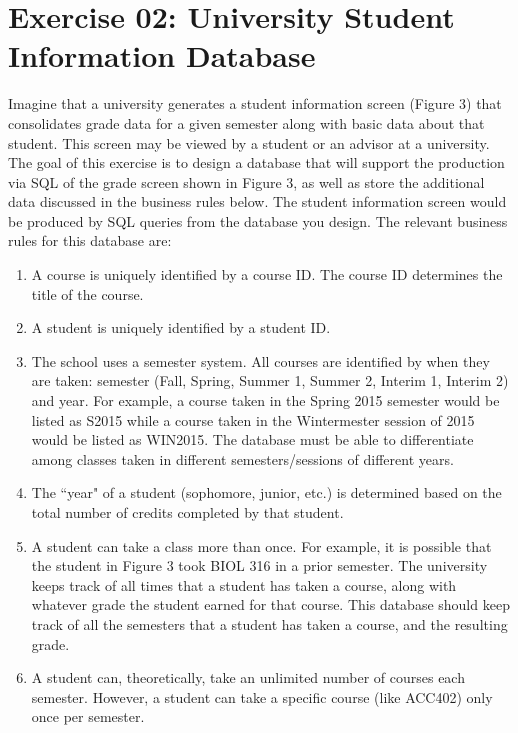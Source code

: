 \documentclass{article}
\begin{document}
\section{Exercise 02: University Student Information Database}
Imagine that a university generates a student information screen (Figure 3) that consolidates grade data for a given semester along with basic data about that student. This screen may be viewed by a student or an advisor at a university. The goal of this exercise is to design a database that will support the production via SQL of the grade screen shown in Figure 3, as well as store the additional data discussed in the business rules below. The student information screen would be produced by SQL queries from the database you design.
The relevant business rules for this database are:
\begin{enumerate}
  \item A course is uniquely identified by a course ID. The course ID determines the title of the course.
  
  \item A student is uniquely identified by a student ID.
  
  \item The school uses a semester system. All courses are identified by when they are taken: semester (Fall, Spring, Summer 1, Summer 2, Interim 1, Interim 2) and year. For example, a course taken in the Spring 2015 semester would be listed as S2015 while a course taken in the Wintermester session of 2015 would be listed as WIN2015. The database must be able to differentiate among classes taken in different semesters/sessions of different years.
  
  \item The ``year" of a student (sophomore, junior, etc.) is determined based on the total number of credits completed by that student.
  
  \item A student can take a class more than once. For example, it is possible that the student in Figure 3 took BIOL 316 in a prior semester. The university keeps track of all times that a student has taken a course, along with whatever grade the student earned for that course. This database should keep track of all the semesters that a student has taken a course, and the resulting grade.
  
  \item A student can, theoretically, take an unlimited number of courses each semester. However, a student can take a specific course (like ACC402) only once per semester.
  

\end{enumerate}
\end{document}
